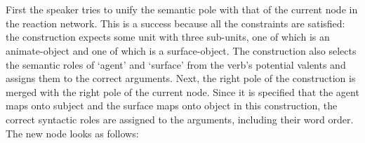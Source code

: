 \\
\\
First the speaker tries to unify the semantic pole with that of the current node in the reaction network. This is a success because all the constraints are satisfied: the construction expects some unit with three sub-units, one of which is an animate-object and one of which is a surface-object. The construction also selects the semantic roles of `agent' and `surface' from the verb's potential valents and assigns them to the correct arguments. Next, the right pole of the construction is merged with the right pole of the current node. Since it is specified that the agent maps onto subject and the surface maps onto object in this construction, the correct syntactic roles are assigned to the arguments, including their word order. The new node looks as follows:
\\
\\
